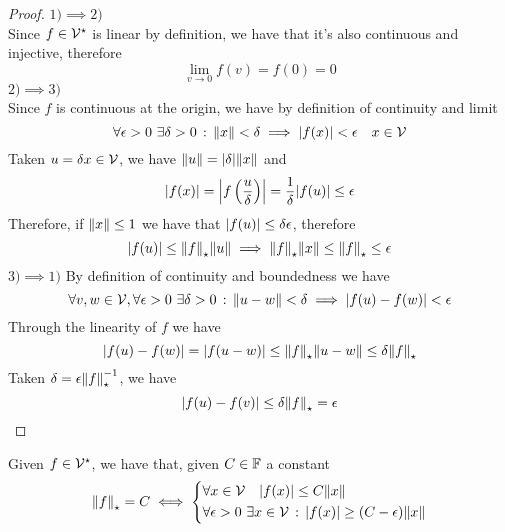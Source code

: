 \documentclass[../complete.tex]{subfiles}
\begin{document}
\begin{proof}
	$1)\implies2)$\\
	Since $f\in\mathcal{V}^\star$ is linear by definition, we have that it's also continuous and injective, therefore
	\begin{equation*}
		\lim_{v\to0}f(v)=f(0)=0
	\end{equation*}
	$2)\implies3)$\\
	Since $f$ is continuous at the origin, we have by definition of continuity and limit
	\begin{equation*}
		\forall\epsilon>0\ \exists\delta>0\st\norm{x}<\delta\implies\abs{f(x)}<\epsilon\quad x\in\V
	\end{equation*}
	Taken $u=\delta x\in\mathcal{V}$, we have $\norm{u}=\abs{\delta}\norm{x}$ and
	\begin{equation*}
		\abs{f(x)}=\abs{f\left( \frac{u}{\delta} \right)}=\frac{1}{\delta}\abs{f(u)}\le\epsilon
	\end{equation*}
	Therefore, if $\norm{x}\le1$ we have that $\abs{f(u)}\le\delta\epsilon$, therefore
	\begin{equation*}
		\abs{f(u)}\le\norm{f}_{\star}\norm{u}\implies\norm{f}_{\star}\norm{x}\le\norm{f}_{\star}\le\epsilon
	\end{equation*}
	$3)\implies1)$
	By definition of continuity and boundedness we have
	\begin{equation*}
		\forall v,w\in\V,\forall\epsilon>0\ \exists\delta>0\st\norm{u-w}<\delta\implies\abs{f(u)-f(w)}<\epsilon
	\end{equation*}
	Through the linearity of $f$ we have
	\begin{equation*}
		\abs{f(u)-f(w)}=\abs{f(u-w)}\le\norm{f}_{\star}\norm{u-w}\le\delta\norm{f}_{\star}
	\end{equation*}
	Taken $\delta=\epsilon\norm{f}_{\star}^{-1}$, we have
	\begin{equation*}
		\abs{f(u)-f(v)}\le\delta\norm{f}_{\star}=\epsilon
	\end{equation*}
\end{proof}
\begin{cor}
	Given $f\in\mathcal{V}^\star$, we have that, given $C\in\mathbb{F}$ a constant
	\begin{equation*}
		\norm{f}_{\star}=C\iff\begin{dcases}\forall x\in\mathcal{V}\quad\abs{f(x)}\le C\norm{x}\\\forall\epsilon>0\ \exists x\in\mathcal{V}\, :\, \abs{f(x)}\ge(C-\epsilon)\norm{x}\end{dcases}
	\end{equation*}
\end{cor}
\end{document}
